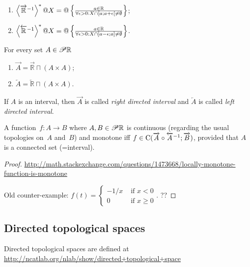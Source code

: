 \begin{xca}~
\begin{enumerate}
\item $\left\langle \overrightarrow{\mathbb{R}}^{-1}\right\rangle ^{\ast}@X = @\left\{ \frac{a\in\mathbb{R}}{\forall\epsilon>0:X\cap[a;a+\epsilon[\ne\emptyset}\right\}$;
\item $\left\langle \overleftarrow{\mathbb{R}}^{-1}\right\rangle ^{\ast}@X = @\left\{ \frac{a\in\mathbb{R}}{\forall\epsilon>0:X\cap]a-\epsilon;a]\ne\emptyset}\right\}$.
\end{enumerate}
\end{xca}

\begin{defn}
For every set $A\in\mathscr{P}\mathbb{R}$
\begin{enumerate}
\item $\overrightarrow{A} = \overrightarrow{\mathbb{R}} \sqcap(A\times A)$;
\item $\overleftarrow{A} = \overleftarrow{\mathbb{R}} \sqcap(A\times A)$.
\end{enumerate}
If $A$ is an interval, then $\overrightarrow{A}$ is called \emph{right directed interval} and $\overleftarrow{A}$ is called \emph{left directed interval}.
\end{defn}

\begin{prop}
A function~$f:A\rightarrow B$ where $A,B\in\mathscr{P}\mathbb{R}$ is continuous (regarding the usual topologies on~$A$ and~$B$) and monotone iff
$f\in\mathrm{C}(\overrightarrow{A}\circ\overleftarrow{A}^{-1};\overrightarrow{B})$, provided that $A$ is a connected set (=interval).
\end{prop}

\begin{proof}
\url{http://math.stackexchange.com/questions/1473668/locally-monotone-function-is-monotone}

Old counter-example: $f(t) = \begin{cases}-1/x&\text{ if }x<0\\0&\text{ if }x\ge 0\end{cases}$.
??
\end{proof}

\subsection{Directed topological spaces}

Directed topological spaces are defined at\\
\url{http://ncatlab.org/nlab/show/directed+topological+space}

